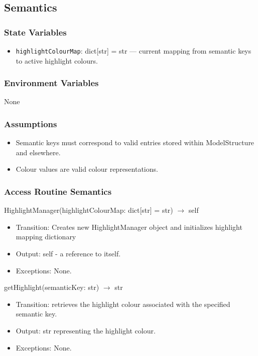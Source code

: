 \documentclass[12pt, titlepage]{article}
\begin{document}
\subsection{Semantics}

\subsubsection{State Variables}

\begin{itemize}
  \item \texttt{highlightColourMap}: dict[str] = str — current mapping from semantic keys to active highlight colours.
\end{itemize}

\subsubsection{Environment Variables}
None


\subsubsection{Assumptions}
\begin{itemize}
  \item Semantic keys must correspond to valid entries stored within ModelStructure and elsewhere.
  \item Colour values are valid colour representations.
\end{itemize}

\subsubsection{Access Routine Semantics}

HighlightManager(highlightColourMap: dict[str] = str) $\rightarrow$ self
\begin{itemize}
  \item Transition: Creates new HighlightManager object and initializes highlight mapping dictionary
  \item Output: self -  a reference to itself.
  \item Exceptions: None.
\end{itemize}

getHighlight(semanticKey: str) $\rightarrow$ str
\begin{itemize}
  \item Transition: retrieves the highlight colour associated with the specified semantic key.
  \item Output: str representing the highlight colour.
  \item Exceptions: None.
\end{itemize}
\end{document}
